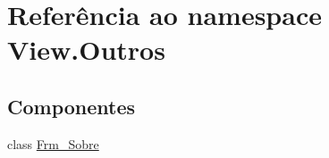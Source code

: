 \hypertarget{namespace_view_1_1_outros}{}\section{Referência ao namespace View.\+Outros}
\label{namespace_view_1_1_outros}
\subsection*{Componentes}
\begin{DoxyCompactItemize}
\item 
class \hyperlink{class_view_1_1_outros_1_1_frm___sobre}{Frm\+\_\+\+Sobre}
\end{DoxyCompactItemize}
